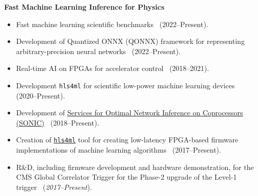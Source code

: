 \documentclass[11pt]{res}
\begin{document}
\begin{resume}
  \textbf{Fast Machine Learning Inference for Physics}
  \begin{itemize}
    \itemsep-0.3em
    \item Fast machine learning scientific benchmarks~\cite{Duarte:2022hdp} (2022--Present).
    \item Development of Quantized ONNX (QONNX) framework for representing arbitrary-precision neural networks~\cite{Pappalardo:2022nxk} (2022--Present).
    \item Real-time AI on FPGAs for accelerator control~\cite{John:2020sak} ({2018--2021}).
    \item Development \texttt{hls4ml} for scientific low-power machine learning devices~\cite{Hussain:2022faststamp,Borras:2022opensource,Banbury:2021mlperf,DiGuglielmo:2021ide,Hawks:2021ruw,Fahim:2021cic} ({2020--Present}).
    \item Development of \href{https://github.com/fastmachinelearning/SonicCMS}{Services for Optimal Network Inference on Coprocessors (SONIC)}~\cite{Krupa:2020bwg,Rankin:2020usv,neurips2019_sonic,Duarte:2019fta} ({2018--Present}).
    \item Creation of \href{https://fastmachinelearning.org/hls4ml/}{\texttt{hls4ml}} tool for creating low-latency FPGA-based firmware implementations of machine learning algorithms~\cite{Deiana:2021niw,Elabd:2021lgo,Govorkova:2021utb,Iiyama:2020wap,Heintz:2020soy,DiGuglielmo:2020eqx,Summers:2020xiy,neurips2019_hls4ml,Duarte:2018ite} ({2017--Present}).
    \item R\&D, including firmware development and hardware demonstration, for the CMS Global Correlator Trigger for the Phase-2 upgrade of the Level-1 trigger~\cite{CERN-LHCC-2020-004} (\emph{2017--Present}).
  \end{itemize}

\end{resume}
\end{document}
